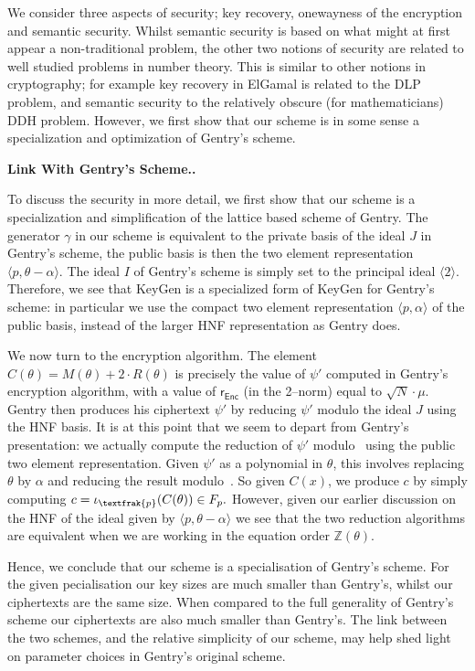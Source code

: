 \documentclass[a4paper, 12pt]{article}
\newcommand{\ndash}{\nobreakdash --}
\newcommand{\bb}[1]{\mathbb{#1}}
\newcommand{\tfr}[1]{\textfrak{#1}}
\newcommand{\tsf}[1]{\textsf{#1}}
\newcommand{\tbf}[1]{\textbf{#1}}
\newenvironment{bparagraph}[1]{
	\vspace{2ex}\noindent\tbf{#1. }\nolinebreak 
}{}
\begin{document}
	We consider three aspects of security; key recovery, onewayness of the encryption and semantic security. 
	Whilst semantic security is based on what might at first appear a non-traditional problem, the other two notions of security are related to well studied problems in number theory. 
	This is similar to other notions in cryptography; for example key recovery in ElGamal is related to the DLP problem,
	and semantic security to the relatively obscure (for mathematicians) DDH problem. 
	However, we first show that our scheme is in some sense a specialization and optimization of Gentry's scheme.
	
	\begin{bparagraph}{Link With Gentry's Scheme.}
		To discuss the security in more detail, we first show that our scheme is a specialization and simplification of the lattice based scheme of Gentry. 
		The generator $\gamma$ in our scheme is  equivalent to the private basis of the ideal $J$ in Gentry's scheme, the public basis is then the two element  representation $\langle p, \theta - \alpha \rangle$. 
		The ideal $I$ of Gentry's scheme is simply set to the principal ideal $\langle 2 \rangle$.
		Therefore, we see that KeyGen is a specialized form of KeyGen for Gentry's scheme: in particular we use the compact two element representation $\langle p, \alpha \rangle$ of the public basis, instead of the larger HNF  representation as Gentry does.
		
		We now turn to the encryption algorithm. 
		The element $C(\theta) = M(\theta) + 2 \cdot R(\theta)$ is precisely the value of $\psi '$ computed in Gentry's encryption algorithm, with a value of $\tsf{r}_\tsf{Enc}$ (in the 2\ndash norm) equal to $\sqrt{N} \cdot \mu$.
		Gentry then produces his ciphertext	$\psi '$ by reducing $\psi '$ modulo the ideal $J$ using the HNF basis.
		It is at this point	that we seem to depart from Gentry's presentation: we actually compute the reduction of $\psi '$ modulo~\tfr{p} using the public two element representation.
		Given $\psi '$ as a polynomial in $\theta$, this involves replacing $\theta$ by $\alpha$ and reducing the result modulo~\tfr{p}. So given $C(x)$, we produce $c$ by simply computing $c = \iota_\tfr{p}(C(\theta)) \in F_p.$
		However, given our earlier discussion on the HNF of the ideal given by $\langle p, \theta - \alpha \rangle$	we see that the two reduction algorithms are equivalent when we are working in	the equation order $\bb{Z}(\theta)$.
		
		Hence, we conclude that our scheme is a specialisation of Gentry's scheme. 
		For the given pecialisation our key sizes are much smaller than Gentry's, whilst our ciphertexts are the same size.
		When compared to the full generality of Gentry's scheme our ciphertexts are also much smaller than Gentry's. 
		The link between the two schemes, and the relative simplicity of our scheme, may help shed light on parameter choices in Gentry's original scheme.
	\end{bparagraph}
	
\end{document}
